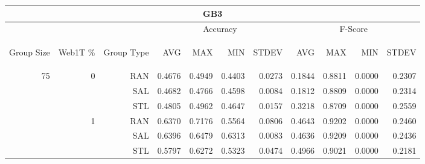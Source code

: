 \begin{center}
\begin{table}[htbp]
\begin{tabular}{ | r | r | r | r | r | r | r | r | r | r | r |}
\hline
\multicolumn{11}{|c|}{GB3}\\
\hline
 & & & \multicolumn{4}{|c|}{Accuracy} & \multicolumn{4}{|c|}{F-Score}\\ \cline{4-11}
\begin{sideways}Group Size\end{sideways} & \begin{sideways}Web1T \%\end{sideways} & \begin{sideways}Group Type\end{sideways} & \begin{sideways}AVG\end{sideways} & \begin{sideways}MAX\end{sideways} & \begin{sideways}MIN\end{sideways} & \begin{sideways}STDEV\end{sideways} & \begin{sideways}AVG\end{sideways} & \begin{sideways}MAX\end{sideways} & \begin{sideways}MIN\end{sideways} & \begin{sideways}STDEV\end{sideways}\\
\hline
\multirow{18}{*}{75}
 & \multirow{3}{*}{0} & RAN & 0.4676 & 0.4949 & 0.4403 & 0.0273 & 0.1844 & 0.8811 & 0.0000 & 0.2307\\ \cline{3-11}
 &   & SAL & 0.4682 & 0.4766 & 0.4598 & 0.0084 & 0.1812 & 0.8809 & 0.0000 & 0.2314\\ \cline{3-11}
 &   & STL & 0.4805 & 0.4962 & 0.4647 & 0.0157 & 0.3218 & 0.8709 & 0.0000 & 0.2559\\ \cline{2-11}
 & \multirow{3}{*}{1} & RAN & 0.6370 & 0.7176 & 0.5564 & 0.0806 & 0.4643 & 0.9202 & 0.0000 & 0.2460\\ \cline{3-11}
 &   & SAL & 0.6396 & 0.6479 & 0.6313 & 0.0083 & 0.4636 & 0.9209 & 0.0000 & 0.2436\\ \cline{3-11}
 &   & STL & 0.5797 & 0.6272 & 0.5323 & 0.0474 & 0.4966 & 0.9021 & 0.0000 & 0.2181\\ \cline{2-11}

\end{tabular}
\end{table}
\end{center}
